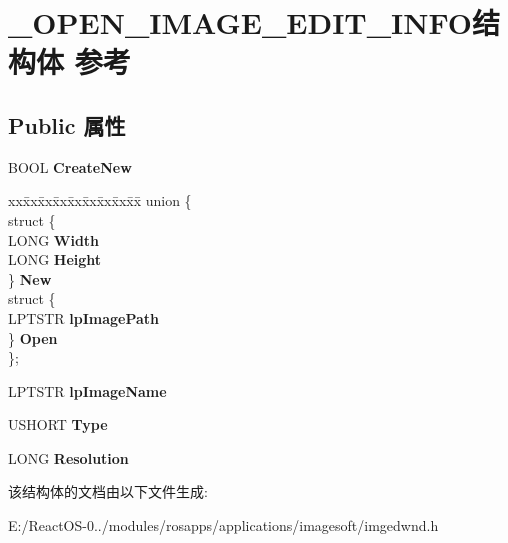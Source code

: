 \hypertarget{struct___o_p_e_n___i_m_a_g_e___e_d_i_t___i_n_f_o}{}\section{\+\_\+\+O\+P\+E\+N\+\_\+\+I\+M\+A\+G\+E\+\_\+\+E\+D\+I\+T\+\_\+\+I\+N\+F\+O结构体 参考}
\label{struct___o_p_e_n___i_m_a_g_e___e_d_i_t___i_n_f_o}
\subsection*{Public 属性}
\begin{DoxyCompactItemize}
\item 
\mbox{\label{struct___o_p_e_n___i_m_a_g_e___e_d_i_t___i_n_f_o_a1b90c4d959c2c701deee4af4deb867a6}} 
B\+O\+OL {\bfseries Create\+New}
\item 
\mbox{\label{struct___o_p_e_n___i_m_a_g_e___e_d_i_t___i_n_f_o_ac031b837c6eedf17a7c7d674b21a4da2}} 
\begin{tabbing}
xx\=xx\=xx\=xx\=xx\=xx\=xx\=xx\=xx\=\kill
union \{\\
\>struct \{\\
\>\>LONG {\bfseries Width}\\
\>\>LONG {\bfseries Height}\\
\>\} {\bfseries New}\\
\>struct \{\\
\>\>LPTSTR {\bfseries lpImagePath}\\
\>\} {\bfseries Open}\\
\}; \\

\end{tabbing}\item 
\mbox{\label{struct___o_p_e_n___i_m_a_g_e___e_d_i_t___i_n_f_o_a8e052f44184b2c5a8bc5388ea165e852}} 
L\+P\+T\+S\+TR {\bfseries lp\+Image\+Name}
\item 
\mbox{\label{struct___o_p_e_n___i_m_a_g_e___e_d_i_t___i_n_f_o_a2df9c2ff959046f799c36c7088f58547}} 
U\+S\+H\+O\+RT {\bfseries Type}
\item 
\mbox{\label{struct___o_p_e_n___i_m_a_g_e___e_d_i_t___i_n_f_o_a7b8ba1de1ba5285376e305dcc556d40d}} 
L\+O\+NG {\bfseries Resolution}
\end{DoxyCompactItemize}


该结构体的文档由以下文件生成\+:\begin{DoxyCompactItemize}
\item 
E\+:/\+React\+O\+S-\/0../modules/rosapps/applications/imagesoft/imgedwnd.\+h\end{DoxyCompactItemize}
